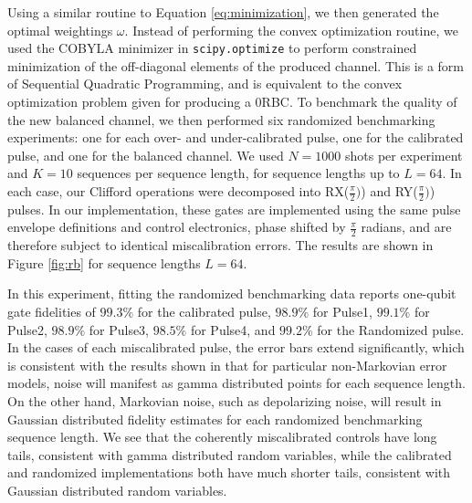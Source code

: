 \documentclass[aps,nofootinbib,pra,notitlepage,twocolumn]{revtex4-1}
\begin{document}
 Using a similar routine to Equation \ref{eq:minimization}, we then generated the optimal weightings $\omega$. Instead of performing the convex optimization routine, we used the COBYLA minimizer in \texttt{scipy.optimize} to perform constrained minimization of the off-diagonal elements of the produced channel. This is a form of Sequential Quadratic
Programming\cite{wright1999numerical}, and is equivalent to the convex optimization problem given for producing a 0RBC. To benchmark the quality of the new balanced channel, we then performed six randomized benchmarking experiments: one for each over- and under-calibrated pulse, one for the calibrated pulse, and one for the balanced channel. We used $N=1000$ shots per experiment and $K=10$ sequences per sequence length, for sequence lengths up to $L=64$\cite{Magesan2011}. In each case, our Clifford operations were decomposed into RX($\frac{\pi}{2})$) and RY($\frac{\pi}{2})$) pulses. In our implementation, these gates are implemented using the same pulse envelope definitions and control electronics, phase shifted by $\frac{\pi}{2}$ radians, and are therefore subject to identical miscalibration errors. The results are shown in Figure \ref{fig:rb} for sequence lengths $L=64$.

In this experiment, fitting the randomized benchmarking data reports one-qubit gate fidelities of $99.3\%$ for the calibrated pulse, $98.9\%$ for Pulse1, $99.1\%$ for Pulse2, $98.9\%$ for Pulse3, $98.5\%$ for Pulse4, and $99.2\%$ for the Randomized pulse. In the cases of each miscalibrated pulse, the error bars extend significantly, which is consistent with the results shown in \cite{Ball2016} that for particular non-Markovian error models, noise will manifest as gamma distributed points for each sequence length. On the other hand, Markovian noise, such as depolarizing noise, will result in Gaussian distributed fidelity estimates for each randomized benchmarking sequence length. We see that the coherently miscalibrated controls have long tails, consistent with gamma distributed random variables, while the calibrated and randomized implementations both have much shorter tails, consistent with Gaussian distributed random variables.
\end{document}
